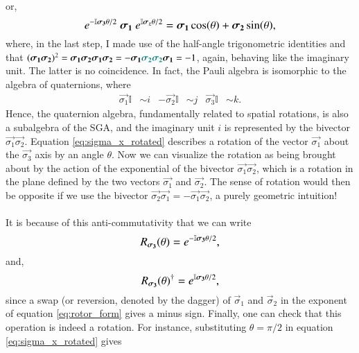 or,
\begin{equation} \label{eq:sigma_x_rotated}
     \large \exp{ -\mathbb{I} \vec{\sigma_3} \theta / 2} \ \vec{\sigma_1}  \
     \exp{ \mathbb{I} \vec{\sigma_z} \theta / 2} =  \vec{\sigma_1} \cos(\theta) + \vec{\sigma_2} \sin(\theta),
\end{equation}
where, in the last step, I made use of the half-angle trigonometric identities and that $ (\vec{\sigma_1} \vec{\sigma_2} )^2 = \vec{\sigma_1} \vec{\sigma_2} \vec{\sigma_1} \vec{\sigma_2} = - \vec{\sigma_1} \color{teal} \vec{\sigma_2} \vec{\sigma_2} \color{black} \vec{\sigma_1} = -1 $, again, behaving like the imaginary unit. The latter is no coincidence. In fact, the Pauli algebra is isomorphic to the algebra of quaternions, where 
\begin{align*}
    \vec{\sigma_1} \mathbb{I} &\sim i &
    -\vec{\sigma_2} \mathbb{I} & \sim j &
    \vec{\sigma_3} \mathbb{I} &\sim k.
\end{align*}    
Hence, the quaternion algebra, fundamentally related to spatial rotations, is also a subalgebra of the SGA, and the imaginary unit $i$ is represented by the bivector $\vec{\sigma_1} \vec{\sigma_2}$. Equation \eqref{eq:sigma_x_rotated} describes a rotation of the vector $\vec{\sigma_1}$ about the $\vec{\sigma_3}$ axis by an angle $\theta$. Now we can visualize the rotation as being brought about by the action of the exponential of the bivector $\vec{\sigma_1} \vec{\sigma_2}$, which is a rotation in the plane defined by the two vectors $\vec{\sigma_1}$ and $\vec{\sigma_2}$. The sense of rotation would then be opposite if we use the bivector $\vec{\sigma_2} \vec{\sigma_1} =-  \vec{\sigma_1} \vec{\sigma_2}$, a purely geometric intuition! 
\\ \\ 
It is because of this anti-commutativity that we can write 
\begin{equation} \label{eq:rotor_form}
    \large R_{\vec{\sigma_3}}(\theta) =  \exp{ -\mathbb{I} \vec{\sigma_3} \theta / 2},
\end{equation}
and,
\begin{equation} \label{eq:rotor_form_reversed}
    \large R_{\vec{\sigma_3}}(\theta)^\dagger =  \exp{ \mathbb{I} \vec{\sigma_3} \theta / 2},
\end{equation}
since a swap (or reversion, denoted by the dagger) of $\vec{\sigma}_1$ and $\vec{\sigma}_2$ in the exponent of equation \eqref{eq:rotor_form} gives a minus sign. Finally, one can check that this operation is indeed a rotation. For instance, substituting $\theta = \pi/2$ in equation \eqref{eq:sigma_x_rotated} gives
